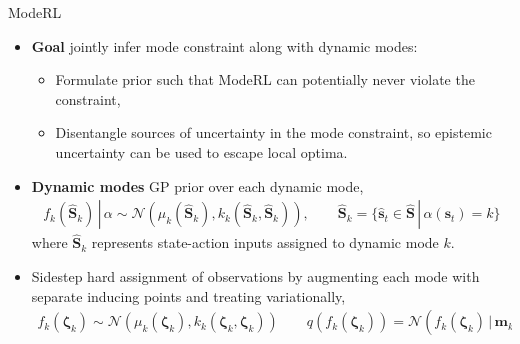\documentclass[final,11pt]{beamer}
\newlength{\colwidth}
\renewcommand{\mid}{\,|\,}
\newcommand{\numData}{\ensuremath{t}}
\newcommand{\modeInd}{\ensuremath{k}}
\newcommand{\NumData}{\ensuremath{\MakeUppercase{\numData}}}
\newcommand{\ModeInd}{\ensuremath{\MakeUppercase{\modeInd}}}
\newcommand{\singleData}[1]{\ensuremath{#1_{\numData}}}
\newcommand{\allData}[1]{\ensuremath{\MakeUppercase{#1}}}
\newcommand{\mode}[1]{\ensuremath{#1_{\modeInd}}}
\newcommand{\state}{\ensuremath{\mathbf{x}}}
\newcommand{\x}{\ensuremath{\mathbf{x}}}
\newcommand{\y}{\ensuremath{y}}
\newcommand{\singleInput}{\ensuremath{\x_{\numData-1}}}
\newcommand{\singleOutput}{\ensuremath{\singleData{\y}}}
\newcommand{\allInput}{\ensuremath{\allData{\x}}}
\newcommand{\allOutput}{\ensuremath{\MakeUppercase{\y}}}
\newcommand{\modeVar}{\ensuremath{\alpha}}
\newcommand{\latentFunc}{\ensuremath{f}}
\newcommand{\timeInd}{\ensuremath{t}}
\newcommand{\TimeInd}{\ensuremath{\MakeUppercase{\timeInd}}}
\renewcommand{\allInput}{\ensuremath{\hat{\state}_{1:\TimeInd}}}
\renewcommand{\allOutput}{\ensuremath{{\Delta\state}_{1:\TimeInd}}}
\renewcommand{\state}{\ensuremath{\mathbf{s}}}
\renewcommand{\mode}[1]{\ensuremath{#1_{\modeInd}}}
\newcommand{\allModeVar}{\ensuremath{\bm{\modeVar}}}
\renewcommand{\numData}{\ensuremath{n}}
\renewcommand{\NumData}{\ensuremath{N}}
\renewcommand{\singleOutput}{\ensuremath{y_{\numData}}}
\renewcommand{\singleInput}{\ensuremath{\mathbf{x}_{\numData}}}
\renewcommand{\allInput}{\ensuremath{\mathbf{X}}}
\renewcommand{\allOutput}{\ensuremath{\mathbf{y}}}
\renewcommand{\allOutput}{\ensuremath{\mathbf{y}}}
\newcommand{\allInputK}{\ensuremath{\mode{\allInput}}}
\newcommand{\expertInducingInput}{\ensuremath{\mode{\bm{\zeta}}}}
\renewcommand{\numData}{\ensuremath{t}}
\renewcommand{\allInput}{\ensuremath{\hat{\mathbf{S}}}}
\renewcommand{\allInputK}{\ensuremath{\mode{\hat{\mathbf{S}}}}}
\renewcommand{\singleInput}{\ensuremath{\hat{\mathbf{s}}_{\timeInd}}}
\renewcommand{\singleOutput}{\ensuremath{\Delta\mathbf{s}_{\timeInd+1}}}
\renewcommand{\allOutput}{\ensuremath{\Delta\mathbf{S}}}
\newcommand{\allOutputK}{\ensuremath{\Delta\mode{\mathbf{S}}}}
\begin{document}
\begin{frame}[t]
\begin{columns}[t]
\begin{column}{\colwidth}
\begin{block}{ModeRL}
    \begin{itemize}
      \item \textbf{Goal} jointly infer mode constraint along with dynamic modes:
      \begin{itemize}
        \item Formulate prior such that \alert{ModeRL} can potentially never violate the constraint,
        \item Disentangle sources of uncertainty in the mode constraint, so \alert{epistemic uncertainty} can be used to escape local optima.
      \end{itemize}
      \item \textbf{Dynamic modes} GP prior over each dynamic mode,
        \begin{align*}
          \mode{\latentFunc}(\allInputK) \mid \modeVar \sim \mathcal{N}\left( \mode{\mu}(\allInputK), \mode{k}(\allInputK, \allInputK) \right),
          \qquad
          \allInputK = \{\singleInput \in \allInput \mid \modeVar(\state_{\timeInd}) = \modeInd\}
        \end{align*}
          where $\allInputK$ represents state-action inputs assigned to dynamic mode $\modeInd$.
      \item Sidestep hard assignment of observations by augmenting each mode with \alert{separate} inducing points and treating variationally,
        \begin{align*}
          \mode{\latentFunc}(\expertInducingInput)  \sim \mathcal{N}\left( \mode{\mu}(\expertInducingInput), \mode{k}(\expertInducingInput, \expertInducingInput ) \right)
          \qquad
          q(\mode{\latentFunc}(\expertInducingInput)) = \mathcal{N}\left(\mode{\latentFunc}(\expertInducingInput) \mid \mode{\mathbf{m}}, \mode{\mathbf{L}} \mode{\mathbf{L}}^{T} \right)
        \end{align*}
    \end{itemize}


\end{block}
\end{column}
\end{columns}
\end{frame}
\end{document}
